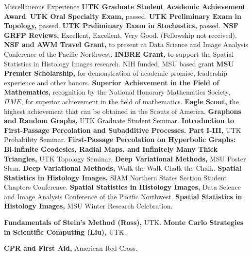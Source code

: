 \begin{rubric}{Miscellaneous Experience}
\entry*[2026] \textbf{UTK Graduate Student Academic Achievement Award}.
\entry*[2025] \textbf{UTK Oral Specialty Exam,} passed.
\entry*[2025] \textbf{UTK Preliminary Exam in Topology,} passed.
\entry*[2025] \textbf{UTK Preliminary Exam in Stochastics,} passed.
\entry*[2020] \textbf{NSF GRFP Reviews,} Excellent, Excellent, Very Good. (Fellowship not received).
\entry*[2020] \textbf{NSF and AWM Travel Grant,} to present at Data Science and Image Analysis Conference of the Pacific Northwest.
\entry*[2019 -- 2020] \textbf{INBRE Grant,} to support the Spatial Statistics in Histology Images research. NIH funded, MSU based grant
\entry*[2016 -- 2020] \textbf{MSU Premier Scholarship,} for demonstration of academic promise, leadership experience and other honors.
\entry*[2019] \textbf{Superior Achievement in the Field of Mathematics,} recognition by the National Honorary Mathematics Society, \(\Pi M E\), for superior achievement in the field of mathematics.
\entry*[2016] \textbf{Eagle Scout,} the highest achievement that can be obtained in the Scouts of America.
%
\entry*[2026] \textbf{Graphons and Random Graphs,} UTK Graduate Student Seminar.
\entry*[2025] \textbf{Introduction to First-Passage Percolation and Subadditive Processes. Part I-III,} UTK Probability Seminar.
\entry*[2025] \textbf{First-Passage Percolation on Hyperbolic Graphs: Bi-infinite Geodesics, Radial Maps, and Infinitely Many Thick Triangles,} UTK Topology Seminar.
\entry*[2021] \textbf{Deep Variational Methods,} MSU Poster Slam.
\entry*[2021] \textbf{Deep Variational Methods,} Walk the Walk Chalk the Chalk.
\entry*[2020] \textbf{Spatial Statistics in Histology Images,} SIAM Northern States Section Student Chapters Conference.
\entry*[2020] \textbf{Spatial Statistics in Histology Images,} Data Science and Image Analysis Conference of the Pacific Northwest.
\entry*[2019] \textbf{Spatial Statistics in Histology Images,} MSU Winter Research Celebration.


\entry*[2026] \textbf{Fundamentals of Stein's Method (Ross),} UTK.
\entry*[2023] \textbf{Monte Carlo Strategies in Scientific Computing (Liu),} UTK.

\entry*[2023] \textbf{CPR and First Aid,} American Red Cross.


\end{rubric}